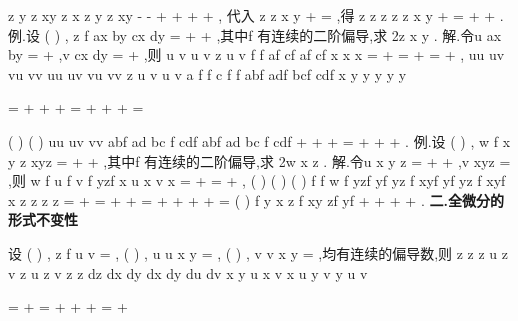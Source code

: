 \partial 
\partial \partial 
\partial 
\partial \partial 
\partial 
\partial 




z y
z
xy
z x
z
y
z
xy
\rho 
\rho 
\rho 
\rho \theta \rho 
\theta 
\rho 
\rho 
\rho 
\theta 
\rho 
\partial 
\partial 
\partial 
\partial 
-
\partial 
-
+
+
+
\cdots 
+
\cdots 
\partial 
\partial \partial 
\partial 
\partial 
\partial 
, 
代入
z
z
x
y
\partial 
\partial 
+
=
\partial 
\partial 
,得
z
z
z
z
z
x
y
\rho 
\rho 
\theta 
\rho 
\rho 
\partial 
\partial 
\partial 
\partial 
\partial 
+
=
+
+
\partial 
\partial 
\partial 
\partial 
\partial 
. 
\textcolor{lyred}{例}.设
(
)
,
z
f ax
by cx
dy
=
+
+
,其中f 有连续的二阶偏导,求
2z
x y
\partial 
\partial \partial . 
解.令u
ax
by
=
+
,v
cx
dy
=
+
,则
u
v
u
v
z
u
v
f
f
af
cf
af
cf
x
x
x
\partial 
\partial 
\partial 
=
+
=
+
=
+
\partial 
\partial 
\partial 
, 
uu
uv
vu
vv
uu
uv
vu
vv
z
u
v
u
v
a
f
f
c
f
f
abf
adf
bcf
cdf
x y
y
y
y
y




\partial 
\partial 
\partial 
\partial 
\partial 
=
+
+
+
=
+
+
+
=




\partial \partial 
\partial 
\partial 
\partial 
\partial 




(
)
(
)
uu
uv
vv
abf
ad
bc f
cdf
abf
ad
bc f
cdf
+
+
+
=
+
+
+
. 
\textcolor{lyred}{例}.设
(
)
,
w
f x
y
z xyz
=
+
+
,其中f 有连续的二阶偏导,求
2w
x z
\partial 
\partial \partial . 
解.令u
x
y
z
=
+
+
,v
xyz
=
,则
w
f
u
f
v
f
yzf
x
u
x
v
x
\partial 
\partial 
\partial 
\partial 
\partial 
=
\cdots 
+
\cdots 
=
+
\partial 
\partial 
\partial 
\partial 
\partial 
, 
(
)
(
)
(
)
f
f
w
f
yzf
yf
yz
f
xyf
yf
yz f
xyf
x z
z
z
z
\partial 
\partial 
\partial 
\partial 
=
+
=
+
+
=
+
+
+
+
=
\partial \partial 
\partial 
\partial 
\partial 
(
)
f
y x
z f
xy zf
yf
+
+
+
+
. 
\vspace{4pt}
{\bfseries \textcolor{lyred}{二.全微分的形式不变性}}

设
(
)
,
z
f u v
=
,
(
)
,
u
u x y
=
,
(
)
,
v
v x y
=
,均有连续的偏导数,则 
z
z
z
u
z
v
z
u
z
v
z
z
dz
dx
dy
dx
dy
du
dv
x
y
u
x
v x
u
y
v y
u
v


\partial 
\partial 
\partial \partial 
\partial \partial 
\partial \partial 
\partial \partial 
\partial 
\partial 


=
+
=
+
+
+
=
+




\partial 
\partial 
\partial 
\partial 
\partial \partial 
\partial 
\partial 
\partial \partial 
\partial 
\partial 




